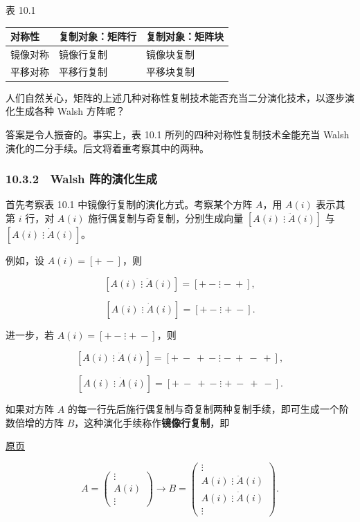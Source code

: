 \documentclass[
  10pt,
  fontset=fandol]{ctexart}
\newcounter{none} %
\begin{document}
表 10.1

{\def\LTcaptype{none} %
\begin{longtable}[]{@{}lll@{}}
\toprule\noalign{}
对称性 & 复制对象：矩阵行 & 复制对象：矩阵块 \\
\midrule\noalign{}
\endhead
\bottomrule\noalign{}
\endlastfoot
镜像对称 & 镜像行复制 & 镜像块复制 \\
平移对称 & 平移行复制 & 平移块复制 \\
\end{longtable}
}

人们自然关心，矩阵的上述几种对称性复制技术能否充当二分演化技术，以逐步演化生成各种 Walsh 方阵呢？

答案是令人振奋的。事实上，表 10.1 所列的四种对称性复制技术全能充当 Walsh 演化的二分手续。后文将着重考察其中的两种。

\subsubsection{10.3.2　Walsh 阵的演化生成}\label{walsh-ux9635ux7684ux6f14ux5316ux751fux6210}

首先考察表 10.1 中镜像行复制的演化方式。考察某个方阵 \(A\)，用 \(A(i)\) 表示其第 \(i\) 行，对 \(A(i)\) 施行偶复制与奇复制，分别生成向量 \([A(i)\mathrel{\vdots}\ddot A(i)]\) 与 \([A(i)\mathrel{\vdots}\dot A(i)]\)。

例如，设 \(A(i)=[+\ -]\)，则

\[
[A(i)\mathrel{\vdots}\ddot A(i)]=[+\ -\mathrel{\vdots}-\ +],
\]

\[
[A(i)\mathrel{\vdots}\dot A(i)]=[+\ -\mathrel{\vdots}+\ -].
\]

进一步，若 \(A(i)=[+\ -\mathrel{\vdots}+\ -]\)，则

\[
[A(i)\mathrel{\vdots}\ddot A(i)]=[+\ -\ +\ -\mathrel{\vdots}-\ +\ -\ +],
\]

\[
[A(i)\mathrel{\vdots}\dot A(i)]=[+\ -\ +\ -\mathrel{\vdots}+\ -\ +\ -].
\]

如果对方阵 \(A\) 的每一行先后施行偶复制与奇复制两种复制手续，即可生成一个阶数倍增的方阵 \(B\)，这种演化手续称作\textbf{镜像行复制}，即

\href{../../source-images/pdf-267.jpeg}{原页}

\[
A=\begin{pmatrix}\vdots\\A(i)\\\vdots\end{pmatrix}
\longrightarrow B=\begin{pmatrix}
\vdots\\
A(i)\mathrel{\vdots}\ddot A(i)\\
A(i)\mathrel{\vdots}\dot A(i)\\
\vdots
\end{pmatrix}.
\]
\end{document}
